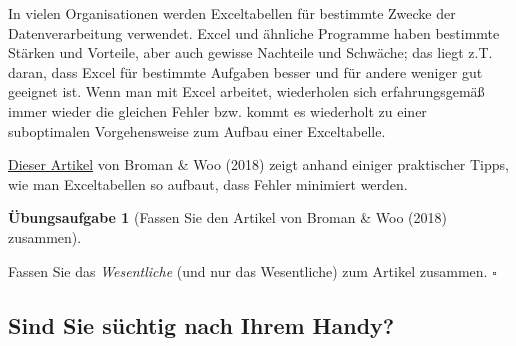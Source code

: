 \documentclass[
  letterpaper,
  twoside,
  open=any]{scrbook}
\theoremstyle{definition}
\newtheorem{exercise}{Übungsaufgabe}[chapter]
\theoremstyle{definition}
\theoremstyle{definition}
\theoremstyle{remark}
\begin{document}
In vielen Organisationen werden Exceltabellen für bestimmte Zwecke der
Datenverarbeitung verwendet. Excel und ähnliche Programme haben
bestimmte Stärken und Vorteile, aber auch gewisse Nachteile und
Schwäche; das liegt z.T. daran, dass Excel für bestimmte Aufgaben besser
und für andere weniger gut geeignet ist. Wenn man mit Excel arbeitet,
wiederholen sich erfahrungsgemäß immer wieder die gleichen Fehler bzw.
kommt es wiederholt zu einer suboptimalen Vorgehensweise zum Aufbau
einer Exceltabelle.

\href{https://www.tandfonline.com/doi/full/10.1080/00031305.2017.1375989}{Dieser
Artikel} von Broman \& Woo (2018) zeigt anhand einiger praktischer
Tipps, wie man Exceltabellen so aufbaut, dass Fehler minimiert werden.

\begin{exercise}[Fassen Sie den Artikel von Broman \& Woo (2018)
zusammen]\protect\hypertarget{exr-xls-paper}{}\label{exr-xls-paper}

Fassen Sie das \emph{Wesentliche} (und nur das Wesentliche) zum Artikel
zusammen. \(\square\)

\end{exercise}

\subsection{Sind Sie süchtig nach Ihrem
Handy?}\label{sind-sie-suxfcchtig-nach-ihrem-handy}
\end{document}
